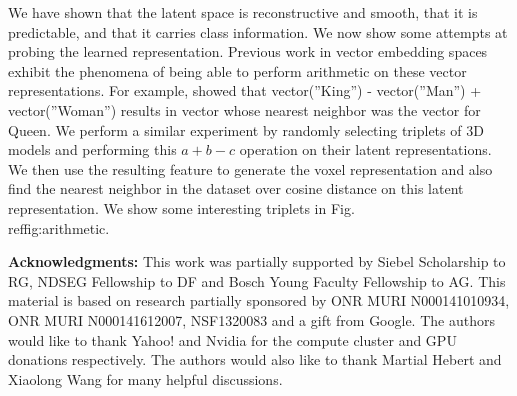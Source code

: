 \documentclass[runningheads]{llncs}
\begin{document}
We have shown that the latent space is reconstructive and smooth, that it is
predictable, and that it carries class information. We now show some attempts
at probing the learned representation.
Previous work in vector embedding spaces~\cite{Radford_arxiv16,Mikolov_NIPS13} exhibit the phenomena of 
being able to perform arithmetic on these vector representations. For example, \cite{Mikolov_NIPS13} showed that
vector(”King”) - vector(”Man”) + vector(”Woman”) results in vector whose nearest neighbor was the 
vector for Queen.
We perform a similar experiment by randomly selecting 
triplets of 3D models and performing this $a+b-c$ operation on their latent representations. We then use the resulting 
feature to generate the voxel representation and also find the nearest neighbor in the dataset over 
cosine distance on this latent representation. We show some interesting
triplets in Fig.\\ref{fig:arithmetic}.


% 
{\small
\noindent \textbf{Acknowledgments:}
This work was partially supported by
Siebel Scholarship to RG, NDSEG Fellowship to DF and Bosch Young Faculty Fellowship to AG.
This material is based on research partially sponsored by ONR MURI N000141010934, ONR
MURI N000141612007, NSF1320083 and a gift from Google. The authors would like to thank Yahoo!
and Nvidia for the compute cluster and GPU donations respectively.
The authors would also like to thank Martial Hebert and Xiaolong Wang for many helpful discussions.
}

\clearpage





\end{document}

